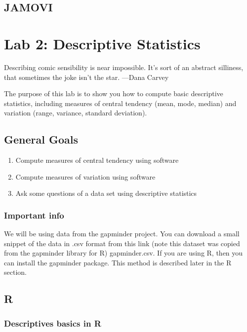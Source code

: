 \documentclass[]{book}
\providecommand{\tightlist}{%
  \setlength{\itemsep}{0pt}\setlength{\parskip}{0pt}}
\begin{document}
\section{JAMOVI}\label{jamovi-1}

\chapter{Lab 2: Descriptive
Statistics}\label{lab-2-descriptive-statistics}

{ Describing comic sensibility is near impossible. It's sort of an
abstract silliness, that sometimes the joke isn't the star. ---Dana
Carvey }

The purpose of this lab is to show you how to compute basic descriptive
statistics, including measures of central tendency (mean, mode, median)
and variation (range, variance, standard deviation).

\section{General Goals}\label{general-goals-1}

\begin{enumerate}
\def\labelenumi{\arabic{enumi}.}
\tightlist
\item
  Compute measures of central tendency using software
\item
  Compute measures of variation using software
\item
  Ask some questions of a data set using descriptive statistics
\end{enumerate}

\subsection{Important info}\label{important-info-1}

We will be using data from the gapminder project. You can download a
small snippet of the data in .csv format from this link (note this
dataset was copied from the gapminder library for R) gapminder.csv. If
you are using R, then you can install the gapminder package. This method
is described later in the R section.

\section{R}\label{r-2}

\subsection{Descriptives basics in R}\label{descriptives-basics-in-r}
\end{document}

